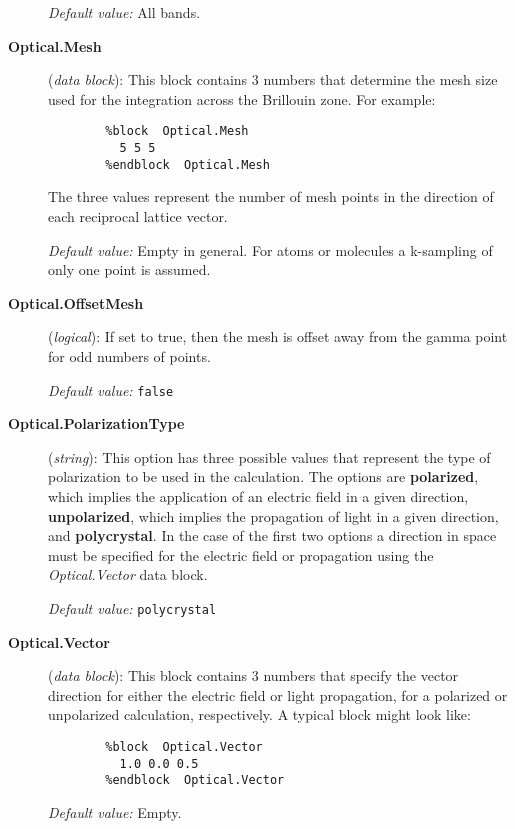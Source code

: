 \documentclass[11pt]{article}
\begin{document}
\begin{description}
{\it Default value:} All bands.

\item[{\bf Optical.Mesh}] ({\it data block}):
This block contains 3 numbers that determine the mesh size
used for the integration across the Brillouin zone. For
example:

\begin{verbatim}
        %block  Optical.Mesh
          5 5 5
        %endblock  Optical.Mesh
\end{verbatim}

The three values represent the number of mesh points in
the direction of each reciprocal lattice vector.

{\it Default value:} Empty in general. For atoms
or molecules a k-sampling of only one point is assumed.

\item[{\bf Optical.OffsetMesh}] ({\it logical}):
If set to true, then the mesh is offset away from the
gamma point for odd numbers of points.

{\it Default value:} {\tt false}

\item[{\bf Optical.PolarizationType}] ({\it string}):
This option has three possible values that represent the
type of polarization to be used in the calculation. The options
are {\bf polarized}, which implies the application of an electric
field in a given direction, {\bf unpolarized}, which implies the
propagation of light in a given direction, and {\bf polycrystal}.
In the case of the first two options a direction in space must
be specified for the electric field or propagation using the
{\it Optical.Vector} data block.

{\it Default value:} {\tt polycrystal}

\item[{\bf Optical.Vector}] ({\it data block}):
This block contains 3 numbers that specify the vector direction
for either the electric field or light propagation, for a polarized
or unpolarized calculation, respectively. A typical block might look
like:

\begin{verbatim}
        %block  Optical.Vector
          1.0 0.0 0.5
        %endblock  Optical.Vector
\end{verbatim}

{\it Default value:} Empty.

\end{description}
\end{document}
